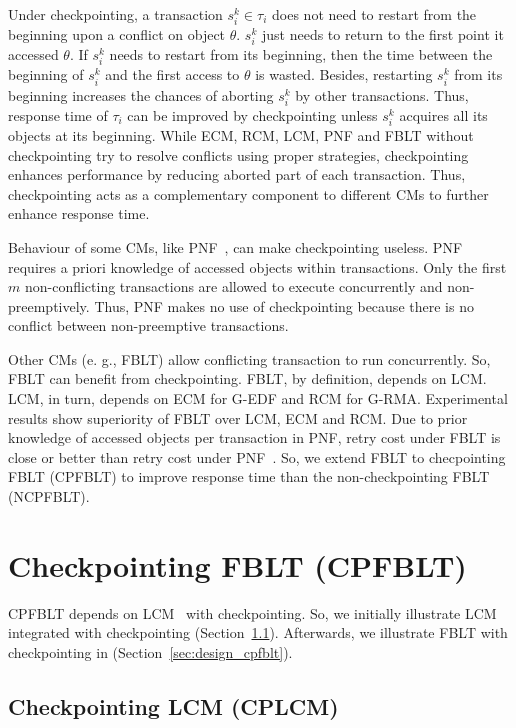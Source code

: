 \documentclass[conference]{IEEEtran}
\begin{document}
Under checkpointing, a transaction $s_i^k \in \tau_i$ does not need to restart from the beginning upon a conflict on object $\theta$. $s_i^k$ just needs to return to the first point it accessed $\theta$. If $s_i^k$ needs to restart from its beginning, then the time between the beginning of $s_i^k$ and the first access to $\theta$ is wasted. Besides, restarting $s_i^k$ from its beginning increases the chances of aborting $s_i^k$ by other transactions. Thus, response time of $\tau_i$ can be improved by checkpointing unless $s_i^k$ acquires all its objects at its beginning. While ECM, RCM, LCM, PNF and FBLT without checkpointing try to resolve conflicts using proper strategies, checkpointing enhances performance by reducing aborted part of each transaction. Thus, checkpointing acts as a complementary component to different CMs to further enhance response time.

Behaviour of some CMs, like PNF~\cite{pnf_dac_asp}, can make checkpointing useless. PNF requires a priori knowledge of accessed objects within transactions. Only the first $m$ non-conflicting transactions are allowed to execute concurrently and non-preemptively. Thus, PNF makes no use of checkpointing because there is no conflict between non-preemptive transactions.

Other CMs (e. g., FBLT\cite{fblt}) allow conflicting transaction to run concurrently. So, FBLT can benefit from checkpointing. FBLT, by definition, depends on LCM. LCM, in turn, depends
on ECM for G-EDF and RCM for G-RMA. Experimental results show superiority of FBLT over LCM, ECM and RCM\cite{fblt}. Due to prior knowledge of accessed objects per transaction in PNF, retry cost under FBLT is close or better than retry cost under PNF~\cite{fblt}. So, we extend FBLT to checpointing FBLT (CPFBLT) to improve response time than the non-checkpointing FBLT (NCPFBLT).

\section{Checkpointing FBLT (CPFBLT)}\label{sec:cpfblt_design}

CPFBLT depends on LCM~\cite{lcmdac2012} with checkpointing. So, we initially illustrate LCM integrated with checkpointing (Section~\ref{sec:cplcm}). Afterwards, we illustrate FBLT with checkpointing in (Section~\ref{sec:design_cpfblt}).

\subsection{Checkpointing LCM (CPLCM)}\label{sec:cplcm}
\end{document}

